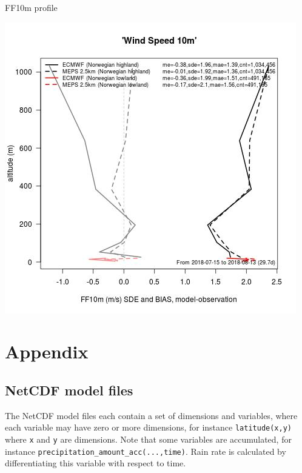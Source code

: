 \documentclass[letterpaper,10pt,twoside,twocolumn,openany]{book}
\begin{document}
{\begin{paperbox}{FF10m profile}
  \centerline{\includegraphics[width=0.75\columnwidth]{ff10m_prof.jpg}}
\end{paperbox}




\hypertarget{appendix}{}
\section{Appendix}
\hypertarget{netcdf}{}
\subsection{NetCDF model files}
The NetCDF model files each contain a set of dimensions and variables, 
where each variable may have zero or more dimensions, for instance \lstinline!latitude(x,y)! where
\lstinline!x! and \lstinline!y! are dimensions. 
Note that some variables are accumulated, for instance \lstinline!precipitation_amount_acc(...,time)!. 
Rain rate is calculated by differentiating this variable with respect to time.

}
\end{document}
